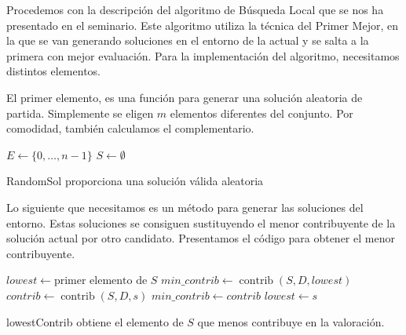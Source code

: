 \documentclass{article}
\begin{document}
Procedemos con la descripción del algoritmo de Búsqueda Local que se nos ha presentado en el seminario. 
Este algoritmo utiliza la técnica del Primer Mejor, en la que se van generando soluciones en el entorno de la actual y se
salta a la primera con mejor evaluación. Para la implementación del algoritmo, necesitamos distintos elementos.

El primer elemento, es una función para generar una solución aleatoria de partida. Simplemente se eligen $m$ elementos 
diferentes del conjunto. Por comodidad, también calculamos el complementario.

\begin{algorithm}[H]
	\DontPrintSemicolon %
	$E \gets \{0,\ldots, n-1\}$ 
	$S \gets \emptyset$ 
	\;
	 
	\caption{{\sc RandomSol} proporciona una solución válida aleatoria}
	\label{alg:randomsol}
\end{algorithm}

Lo siguiente que necesitamos es un método para generar las soluciones del entorno. Estas soluciones se consiguen sustituyendo
el menor contribuyente de la solución actual por otro candidato. Presentamos el código para obtener el menor contribuyente.

 \begin{algorithm}[H]
	\DontPrintSemicolon %
	$lowest \gets \text{primer elemento de } S$\;
	$min\_contrib \gets \operatorname{contrib}(S,D,lowest)$\;
	 {
		$contrib \gets \operatorname{contrib}(S,D,s)$\;
		 { 
			$min\_contrib \gets contrib$\;
			$lowest \gets s$ 
		}
	}
	\;
	\;
	\caption{{\sc lowestContrib} obtiene el elemento de $S$ que menos contribuye en la valoración.}
	\label{alg:lowest-contributor}
\end{algorithm}
\end{document}

